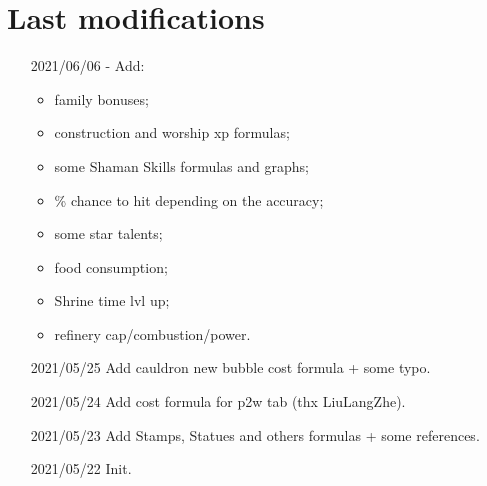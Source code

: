     \section{Last modifications}
        \begin{itemize}
            \item[2021/06/06]- Add:
                \begin{itemize}
                    \item family bonuses;
                    \item construction and worship xp formulas;
                    \item some Shaman Skills formulas and graphs;
                    \item \% chance to hit depending on the accuracy;
                    \item some star talents;
                    \item food consumption;
                    \item Shrine time lvl up;
                    \item refinery cap/combustion/power.
                \end{itemize} 
            \item[2021/05/25] Add cauldron new bubble cost formula + some typo.
            \item[2021/05/24] Add cost formula for p2w tab (thx LiuLangZhe).
            \item[2021/05/23] Add Stamps, Statues and others formulas + some references. 
            \item[2021/05/22] Init.
        \end{itemize}